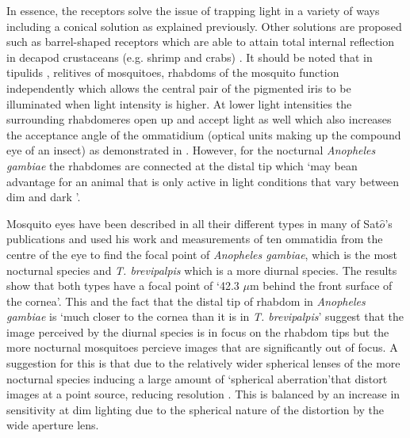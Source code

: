 In essence, the receptors solve the issue of trapping light in a variety of ways \cite{warrant1991strategies} including a conical solution as explained previously. Other solutions are proposed such as barrel-shaped receptors which are able to attain total internal reflection in decapod crustaceans (e.g. shrimp and crabs) \cite{bryceson1983image}. It should be noted that in tipulids , relitives of mosquitoes, rhabdoms of the mosquito function independently \cite{ro1995pupil} which allows the central pair of the pigmented iris to be illuminated when light intensity is higher. At lower light intensities the surrounding rhabdomeres open up and accept light as well which also increases the acceptance angle of the ommatidium (optical units making up the compound eye of an insect) as demonstrated in \cite{land1997mosquito}. However, for the nocturnal \textit{Anopheles gambiae} the rhabdomes are connected at the distal tip which \lq may bean advantage for an animal that is only active in light conditions that vary between dim and dark \rq\cite{land1997mosquito}. 


Mosquito eyes have been described in all their different types in many of Sat$\hat{o}$'s publications and \cite{land1999fundamental} used his work and measurements of ten ommatidia from the centre of the eye to find the focal point of \textit{Anopheles gambiae}, which is the most nocturnal species and \textit{T. brevipalpis} which is a more diurnal species. The results show that both types have a focal point of \lq 42.3 $\mu$m behind the front surface of the cornea\rq. This and the fact that the distal tip of rhabdom in  \textit{Anopheles gambiae} is \lq much closer to the cornea than it is in \textit{T. brevipalpis}\rq\cite{land1999fundamental} suggest that the image perceived by the diurnal species is in focus on the rhabdom tips but the more nocturnal mosquitoes percieve images that are significantly out of focus. A suggestion for this is that due to the relatively wider spherical lenses of the more nocturnal species inducing a large amount of \lq spherical aberration\rq that distort images at a point source, reducing resolution \cite{land1999fundamental}. This is balanced by an increase in sensitivity at dim lighting due to the spherical nature of the distortion by the wide aperture lens. 


